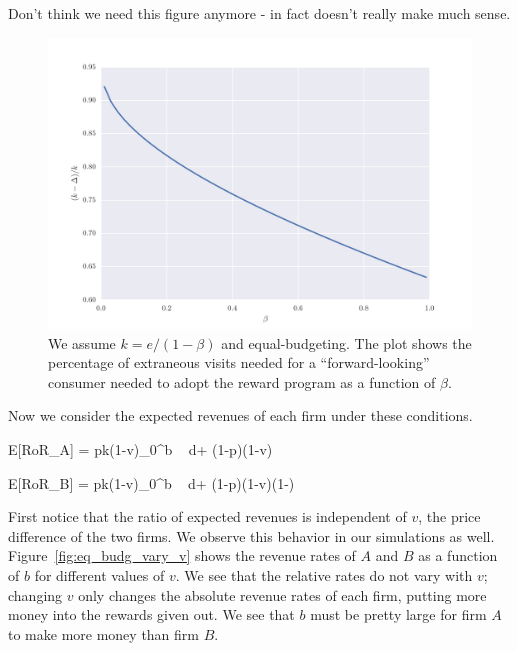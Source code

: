 {\nolan Don't think we need this figure anymore - in fact doesn't really make much sense.}

\begin{figure}[h!]
\begin{centering}
\includegraphics[scale = 0.75]{./figures/phase_trans.pdf}
\caption{We assume $k = e/(1-\beta)$ and equal-budgeting. The plot shows the percentage of extraneous visits needed for a ``forward-looking'' consumer needed to adopt the reward program as a function of $\beta$.}
\label{fig:phase_trans}
\end{centering}
\end{figure}

Now we consider the expected revenues of each firm under these conditions.

\beq
{}E[RoR_A] = pk(1-v)\int_0^b  \mbox{ } d\lambda + (1-p)(1-v)
\eeq

\beq
{}E[RoR_B] = pk(1-v)\int_0^b  \mbox{ } d\lambda + (1-p)(1-v)\left(1-\right)
\eeq

First notice that the ratio of expected revenues is independent of $v$, the price difference of the two firms. We observe this behavior in our simulations as well. Figure~\ref{fig:eq_budg_vary_v} shows the revenue rates of $A$ and $B$ as a function of $b$ for different values of $v$. We see that the relative rates do not vary with $v$; changing $v$ only changes the absolute revenue rates of each firm, putting more money into the rewards given out. We see that $b$ must be pretty large for firm $A$ to make more money than firm $B$. 

